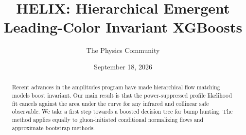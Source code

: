 \documentclass[11pt]{article}
\title{HELIX: Hierarchical Emergent Leading-Color Invariant XGBoosts}
\author{The Physics Community}
\date{September 18, 2026}
\numberwithin{equation}{section}
\theoremstyle{definition}
\theoremstyle{remark}
\begin{document}
\maketitle
\begin{abstract}
Recent advances in the amplitudes program have made hierarchical flow
matching models boost invariant. Our main result is that the
power-suppressed profile likelihood fit cancels against the area under
the curve for any infrared and collinear safe observable. We take a
first step towards a boosted decision tree for bump hunting. The method
applies equally to gluon-initiated conditional normalizing flows and
approximate bootstrap methods.
\end{abstract}
\tableofcontents




\nocite{*}


\end{document}
